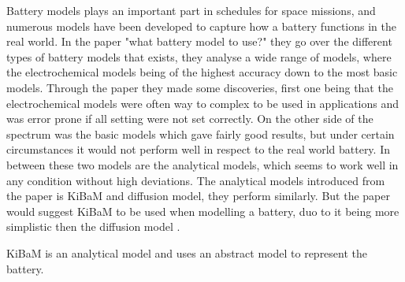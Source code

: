Battery models plays an important part in schedules for space missions, and numerous models have been developed to capture how a battery functions in the real world. In the paper "what battery model to use?"\cite{battery_model} they go over the different types of battery models that exists, they analyse a wide range of models, where the electrochemical models being of the highest accuracy down to the most basic models. 
Through the paper\cite{battery_model} they made some discoveries, first one being that the electrochemical models were often way to complex to be used in applications and was error prone if all setting were not set correctly. On the other side of the spectrum was the basic models which gave fairly good results, but under certain circumstances it would not perform well in respect to the real world battery. In between these two models are the analytical models, which seems to work well in any condition without high deviations. The analytical models introduced from the paper is KiBaM and diffusion model, they perform similarly. But the paper would suggest KiBaM to be used when modelling a battery, duo to it being more simplistic then the diffusion model \cite{battery_model}.

KiBaM is an analytical model and uses an abstract model to represent the battery.
